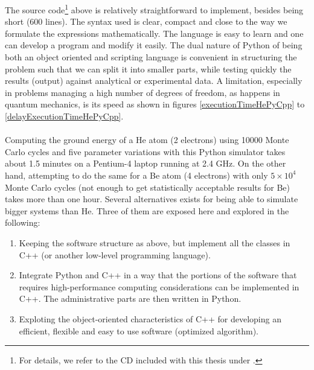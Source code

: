 The source code\footnote{For details, we refer to the CD included with this thesis under .} above is relatively straightforward to implement, besides being short (600 lines). The syntax used is clear, compact and close to the way we formulate the expressions mathematically. The language is easy to learn and one can develop a program and modify it easily. The dual nature of Python of being both an object oriented and scripting language is convenient in structuring the problem such that we can split it into smaller parts, while testing quickly the results (output) against analytical or experimental data. A limitation, especially in problems managing a high number of degrees of freedom, as happens in quantum mechanics, is its speed as shown in figures \ref{executionTimeHePyCpp} to \ref{delayExecutionTimeHePyCpp}.\\
\\
Computing the ground energy of a He atom (2 electrons) using 10000 Monte Carlo cycles and five parameter variations with this Python simulator takes about  1.5 mi\-nu\-tes on a Pentium-4 laptop running at 2.4 GHz. On the other hand, attempting to do the same for a Be atom (4 electrons) with only $5 \times 10^4$ Monte Carlo cycles (not enough to get statistically acceptable results for Be) takes more than one hour. Several alternatives exists for being able to simulate bigger systems than He. Three of them are exposed here and explored in the following: 
\begin{enumerate}
 \item Keeping the software structure as above, but implement all the classes in C++ (or another low-level programming language).
 \item Integrate Python and C++ in a way that the portions of the software that requires high-performance computing considerations can be implemented in C++. The administrative parts are then written in Python.
 \item Exploting the object-oriented characteristics of C++ for developing an efficient, flexible and easy to use software (optimized algorithm).
\end{enumerate}


